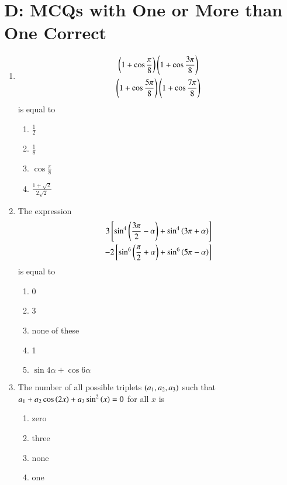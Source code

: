 \documentclass[journal,12pt,twocolumn,article]{IEEEtran}
\theoremstyle{remark}
\begin{document}
\section*{D: MCQs with One or More than One Correct}
\begin{enumerate}
\item 
\begin{multline*}
\left(1 + \cos\frac{\pi}{8}\right)\left(1 + \cos\frac{3\pi}{8}\right)\\
\left(1 + \cos\frac{5\pi}{8}\right)\left(1 + \cos\frac{7\pi}{8}\right) 
\end{multline*}
is equal to
\hfill{}
\begin{multicols}{2}
\begin{enumerate}
\item $\frac{1}{2}$
\item $\frac{1}{8}$
\columnbreak
\item $\cos \frac{\pi}{8}$
\item $\frac{1+\sqrt{2}}{2\sqrt{2}}$
\end{enumerate}
\end{multicols}
\item The expression 
\begin{align*}
3{}\left[\sin^4\left(\frac{3\pi}{2} - \alpha\right) + \sin^4\left(3\pi + \alpha\right)\right]  \\ - 2{}\left[\sin^6\left(\frac{\pi}{2} + \alpha\right) + \sin^6\left(5\pi - \alpha\right)\right]
\end{align*}
is equal to
\hfill{}
\begin{multicols}{2}
\begin{enumerate}
\item 0
\item 3
\item none of these
\columnbreak
\item 1
\item $\sin4\alpha + \cos6\alpha$
\end{enumerate}
\end{multicols}
\item The number of all possible triplets $\left(a_1, a_2, a_3\right)$ such that $a_1 + a_2 \cos\left(2x\right) + a_3\sin^2\left(x\right) = 0$ for all $x$ is
\hfill{}
\begin{multicols}{2}
\begin{enumerate}
\item zero
\item three
\item none
\columnbreak
\item one

\end{enumerate}
\end{multicols}
\end{enumerate}
\end{document}
